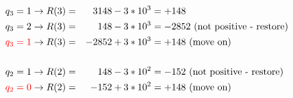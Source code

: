 \documentclass{article}
\begin{document}
\begin{align*}
    q_3 = 1                  & \rightarrow R(3) = & 3148 - 3 * 10^3  & = +148                                   \\
    q_3 = 2                  & \rightarrow R(3) = & 148 - 3 * 10^3   & = -2852 \text{ (not positive - restore)} \\
    \textcolor{red}{q_3 = 1} & \rightarrow R(3) = & -2852 + 3 * 10^3 & = +148 \text{ (move on)}                 \\
    \\
    q_2 = 1                  & \rightarrow R(2) = & 148 - 3 * 10^2   & = -152 \text{ (not positive - restore)}  \\
    \textcolor{red}{q_2 = 0} & \rightarrow R(2) = & -152 + 3 * 10^2  & = +148 \text{ (move on)}                 \\
    \\
\end{align*}
\end{document}
